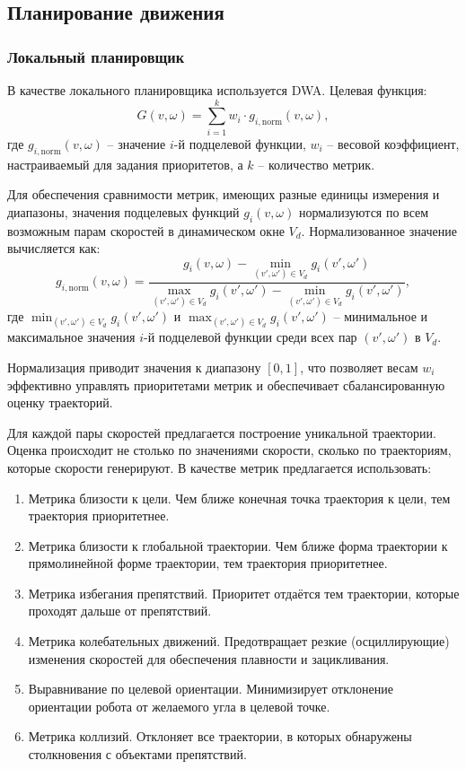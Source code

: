 \subsection{Планирование движения}


\subsubsection{Локальный планировщик}

В качестве локального планировщика используется DWA.
Целевая функция:
\begin{equation}
	G(v, \omega) = \sum_{i=1}^k w_i \cdot g_{i, \text{norm}}(v, \omega),
\end{equation}
где $g_{i,\text{norm}}(v, \omega)$ -- значение $i$-й подцелевой функции,
$w_i$ -- весовой коэффициент,
настраиваемый для задания приоритетов, а $k$ -- количество метрик.

Для обеспечения сравнимости метрик,
имеющих разные единицы измерения и диапазоны,
значения подцелевых функций $g_i(v, \omega)$ нормализуются по всем возможным парам скоростей 
в динамическом окне $V_d$.
Нормализованное значение вычисляется как:
\begin{equation}
	g_{i, \text{norm}}(v, \omega) = \frac{g_i(v, \omega) - \min_{(v', \omega') \in V_d} g_i(v', \omega')}{\max_{(v', \omega') \in V_d} g_i(v', \omega') - \min_{(v', \omega') \in V_d} g_i(v', \omega')},
\end{equation}
где $\min_{(v', \omega') \in V_d} g_i(v', \omega')$ и $\max_{(v', \omega') \in V_d} g_i(v', \omega')$ --
минимальное и максимальное значения $i$-й подцелевой функции среди всех пар $(v', \omega')$ в $V_d$.

Нормализация приводит значения к диапазону $[0, 1]$, что позволяет весам $w_i$ эффективно управлять
приоритетами метрик и обеспечивает сбалансированную оценку траекторий.

Для каждой пары скоростей предлагается построение уникальной траектории.
Оценка происходит не столько по значениями скорости, сколько по траекториям, которые скорости генерируют.
В качестве метрик предлагается использовать:
\begin{enumerate}
    \item Метрика близости к цели. Чем ближе конечная точка траектория к цели, 
	    тем траектория приоритетнее.
    \item Метрика близости к глобальной траектории. Чем ближе форма траектории к прямолинейной форме траектории,
	    тем траектория приоритетнее.  
    \item Метрика избегания препятствий. Приоритет отдаётся тем траектории, 
	    которые проходят дальше от препятствий.
    \item Метрика колебательных движений. Предотвращает резкие (осциллирующие) изменения скоростей 
	    для обеспечения плавности и зацикливания.
    \item Выравнивание по целевой ориентации. 
	    Минимизирует отклонение ориентации робота от желаемого угла в целевой точке.
    \item Метрика коллизий. Отклоняет все траектории, 
	    в которых обнаружены столкновения с объектами препятствий.
\end{enumerate}


